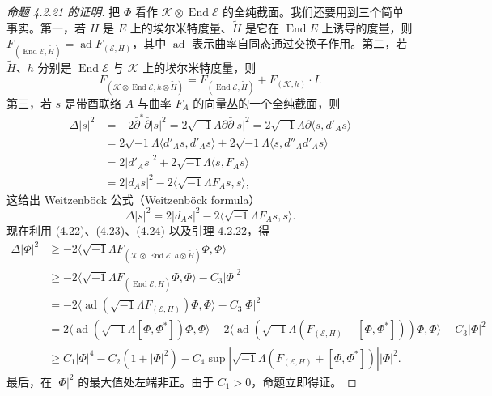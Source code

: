 \begin{proof}[命题 4.2.21 的证明]
把 $\Phi$ 看作 $\mathcal{K}\otimes\operatorname{End}\mathcal{E}$ 的全纯截面。我们还要用到三个简单事实。第一，若 $H$ 是 $E$ 上的埃尔米特度量、$\tilde{H}$ 是它在 $\operatorname{End}E$ 上诱导的度量，则 $F_{(\operatorname{End}\mathcal{E},\tilde{H})}=\operatorname{ad}F_{(\mathcal{E},H)}$，其中 $\operatorname{ad}$ 表示曲率自同态通过交换子作用。第二，若 $\tilde{H}$、$h$ 分别是 $\operatorname{End}\mathcal{E}$ 与 $\mathcal{K}$ 上的埃尔米特度量，则
\begin{equation}
F_{(\mathcal{K}\otimes\operatorname{End}\mathcal{E},h\otimes\tilde{H})}=F_{(\operatorname{End}\mathcal{E},\tilde{H})}+F_{(\mathcal{K},h)}\cdot I.
\label{eq:4.23}
\tag{4.23}
\end{equation}
第三，若 $s$ 是带酉联络 $A$ 与曲率 $F_A$ 的向量丛的一个全纯截面，则
\[
\begin{aligned}
\Delta|s|^2&=-2\bar\partial^*\bar\partial|s|^2=2\sqrt{-1}\Lambda\partial\bar\partial|s|^2=2\sqrt{-1}\Lambda\partial\langle s,d'_As\rangle\\
&=2\sqrt{-1}\Lambda\langle d'_As,d'_As\rangle+2\sqrt{-1}\Lambda\langle s,d''_Ad'_As\rangle\\
&=2|d'_As|^2+2\sqrt{-1}\Lambda\langle s,F_As\rangle\\
&=2|d_As|^2-2\langle\sqrt{-1}\Lambda F_As,s\rangle,
\end{aligned}
\]
这给出 Weitzenböck 公式（Weitzenböck formula）
\begin{equation}
\Delta|s|^2=2|d_As|^2-2\langle\sqrt{-1}\Lambda F_As,s\rangle.
\label{eq:4.24}
\tag{4.24}
\end{equation}
现在利用 (4.22)、(4.23)、(4.24) 以及引理 4.2.22，得
\[
\begin{aligned}
\Delta|\Phi|^2&\ge-2\langle\sqrt{-1}\Lambda F_{(\mathcal{K}\otimes\operatorname{End}\mathcal{E},h\otimes\tilde{H})}\Phi,\Phi\rangle\\
&\ge-2\langle\sqrt{-1}\Lambda F_{(\operatorname{End}\mathcal{E},\tilde{H})}\Phi,\Phi\rangle-C_3|\Phi|^2\\
&=-2\langle\operatorname{ad}(\sqrt{-1}\Lambda F_{(\mathcal{E},H)})\Phi,\Phi\rangle-C_3|\Phi|^2\\
&=2\langle\operatorname{ad}(\sqrt{-1}\Lambda[\Phi,\Phi^*])\Phi,\Phi\rangle-2\langle\operatorname{ad}(\sqrt{-1}\Lambda(F_{(\mathcal{E},H)}+[\Phi,\Phi^*]))\Phi,\Phi\rangle-C_3|\Phi|^2\\
&\ge C_1|\Phi|^4-C_2(1+|\Phi|^2)-C_4\sup\left|\sqrt{-1}\Lambda(F_{(\mathcal{E},H)}+[\Phi,\Phi^*])\right||\Phi|^2.
\end{aligned}
\]
最后，在 $|\Phi|^2$ 的最大值处左端非正。由于 $C_1>0$，命题立即得证。
\end{proof}

